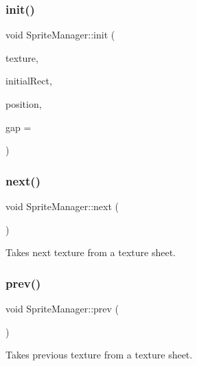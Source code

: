 \mbox{\label{class_sprite_manager_a6bc9f6b77d54099de6fcf84ec1e360bd}} 
\subsubsection{\texorpdfstring{init()}{init()}}
{\footnotesize\ttfamily void Sprite\+Manager\+::init (\begin{DoxyParamCaption}\item[{sf\+::\+Texture $\ast$}]{texture,  }\item[{const sf\+::\+Int\+Rect \&}]{initial\+Rect,  }\item[{const sf\+::\+Vector2f \&}]{position,  }\item[{int}]{gap = {} }\end{DoxyParamCaption})}

\mbox{\label{class_sprite_manager_acdcd181f96ed049db0bf445a71e4b6e2}} 
\subsubsection{\texorpdfstring{next()}{next()}}
{\footnotesize\ttfamily void Sprite\+Manager\+::next (\begin{DoxyParamCaption}{ }\end{DoxyParamCaption})}



Takes next texture from a texture sheet. 

\mbox{\label{class_sprite_manager_a45d2b2613bb95d34ce8e0ad28e261ef1}} 
\subsubsection{\texorpdfstring{prev()}{prev()}}
{\footnotesize\ttfamily void Sprite\+Manager\+::prev (\begin{DoxyParamCaption}{ }\end{DoxyParamCaption})}



Takes previous texture from a texture sheet. 

